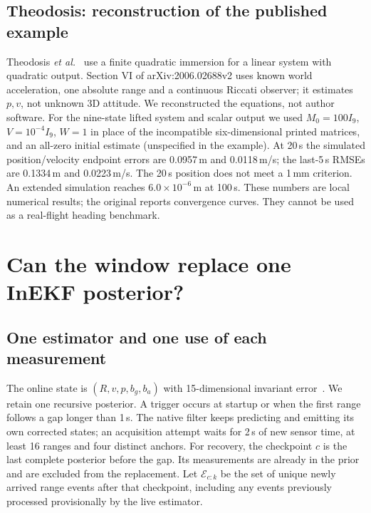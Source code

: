\documentclass[conference,letterpaper,10pt]{IEEEtran}
\begin{document}
\subsection{Theodosis: reconstruction of the published example}
Theodosis \emph{et al.}~\cite{theodosis} use a finite quadratic immersion for a linear system with quadratic output. Section VI of arXiv:2006.02688v2 uses known world acceleration, one absolute range and a continuous Riccati observer; it estimates $p,v$, not unknown 3D attitude. We reconstructed the equations, not author software. For the nine-state lifted system and scalar output we used $M_0=100 I_9$, $V=10^{-4}I_9$, $W=1$ in place of the incompatible six-dimensional printed matrices, and an all-zero initial estimate (unspecified in the example). At 20\,s the simulated position/velocity endpoint errors are 0.0957\,m and 0.0118\,m/s; the last-5\,s RMSEs are 0.1334\,m and 0.0223\,m/s. The 20\,s position does not meet a 1\,mm criterion. An extended simulation reaches $6.0\times10^{-6}$\,m at 100\,s. These numbers are local numerical results; the original reports convergence curves. They cannot be used as a real-flight heading benchmark.
\section{Can the window replace one InEKF posterior?}
\subsection{One estimator and one use of each measurement}
The online state is $(R,v,p,b_g,b_a)$ with 15-dimensional invariant error~\cite{barrau}. We retain one recursive posterior. A trigger occurs at startup or when the first range follows a gap longer than 1\,s. The native filter keeps predicting and emitting its own corrected states; an acquisition attempt waits for 2\,s of new sensor time, at least 16 ranges and four distinct anchors. For recovery, the checkpoint $c$ is the last complete posterior before the gap. Its measurements are already in the prior and are excluded from the replacement. Let $\mathcal E_{c:k}$ be the set of unique newly arrived range events after that checkpoint, including any events previously processed provisionally by the live estimator.
\end{document}
